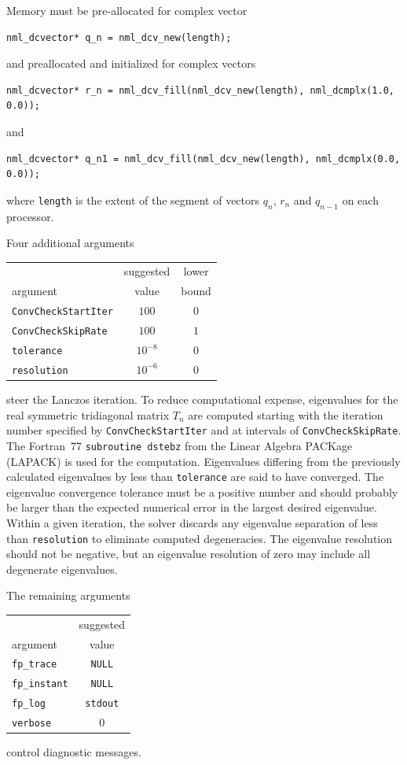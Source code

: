 \documentclass[twoside,12pt]{article}
\begin{document}
Memory must be pre-allocated for complex vector
\begin{verbatim}
nml_dcvector* q_n = nml_dcv_new(length);
\end{verbatim}
and preallocated and initialized for complex vectors
\begin{verbatim}
nml_dcvector* r_n = nml_dcv_fill(nml_dcv_new(length), nml_dcmplx(1.0, 0.0));
\end{verbatim}
and
\begin{verbatim}
nml_dcvector* q_n1 = nml_dcv_fill(nml_dcv_new(length), nml_dcmplx(0.0, 0.0));
\end{verbatim}
where {\tt length} is the extent of the segment
of vectors $q_{n}$, $r_{n}$ and $q_{n\!-\!1}$ on each processor.

Four additional arguments
\begin{center}
\begin{tabular}{l|c|c}
			& suggested	&lower	\\
argument		& value		&bound	\\
\hline
{\tt ConvCheckStartIter}&$100$		&$0$	\\
{\tt ConvCheckSkipRate}	&$100$		&$1$	\\
\hline
{\tt tolerance}		&$10^{-8}$	&$0$	\\
{\tt resolution}	&$10^{-6}$	&$0$
\end{tabular}
\end{center}
steer the Lanczos iteration.
To reduce computational expense, eigenvalues for the real symmetric 
tridiagonal matrix $T_{n}$ are computed starting with the iteration
number specified by {\tt ConvCheckStartIter} and at intervals of 
{\tt ConvCheckSkipRate}.
The Fortran~77 {\tt subroutine dstebz} from the Linear Algebra PACKage (LAPACK)
is used for the computation.
Eigenvalues differing from the previously calculated eigenvalues
by less than {\tt tolerance} are said to have converged.
The eigenvalue convergence tolerance must be a positive number
and should probably be larger than the expected numerical error
in the largest desired eigenvalue.
Within a given iteration, the solver discards any eigenvalue 
separation of less than {\tt resolution} to eliminate computed degeneracies.
The eigenvalue resolution should not be negative,
but an eigenvalue resolution of zero may include all degenerate eigenvalues.

The remaining arguments
\begin{center}
\begin{tabular}{l|c}
			& suggested	\\
argument		& value		\\
\hline
{\tt fp\_trace}		&{\tt NULL}	\\
{\tt fp\_instant}	&{\tt NULL}	\\
{\tt fp\_log}		&{\tt stdout}	\\
{\tt verbose}		&$0$
\end{tabular}
\end{center}
control diagnostic messages.
\end{document}
